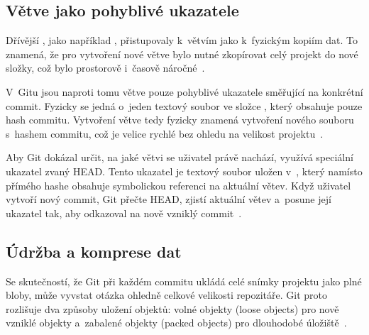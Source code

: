 \subsection*{Větve jako pohyblivé ukazatele}
\label{subsec:git:vetve_pohyblive_ukazatele}
Dřívější \VCS{}, jako například \SVN{}, přistupovaly k~větvím jako k~fyzickým kopiím dat. To znamená, že pro vytvoření nové větve bylo nutné zkopírovat celý projekt do nové složky, což bylo prostorově i~časově náročné~\cite{chacon2014progit}.

V~Gitu jsou naproti tomu větve pouze pohyblivé ukazatele směřující na konkrétní commit. Fyzicky se jedná o~jeden textový soubor ve složce , který obsahuje pouze hash commitu. Vytvoření větve tedy fyzicky znamená vytvoření nového souboru s~hashem commitu, což je velice rychlé bez ohledu na velikost projektu~\cite{chacon2014progit}.

Aby Git dokázal určit, na jaké větvi se uživatel právě nachází, využívá speciální ukazatel zvaný HEAD. Tento ukazatel je textový soubor uložen v~, který namísto přímého hashe obsahuje symbolickou referenci na aktuální větev. Když uživatel vytvoří nový commit, Git přečte HEAD, zjistí aktuální větev a~posune její ukazatel tak, aby odkazoval na nově vzniklý commit~\cite{chacon2014progit}.


\subsection*{Údržba a komprese dat} %
\label{subsec:git:udrzba_komprese_dat}
Se skutečností, že Git při každém commitu ukládá celé snímky projektu jako plné bloby, může vyvstat otázka ohledně celkové velikosti repozitáře. Git proto rozlišuje dva způsoby uložení objektů: volné objekty (loose objects) pro nově vzniklé objekty a~zabalené objekty (packed objects) pro dlouhodobé úložiště~\cite{chacon2014progit}.

